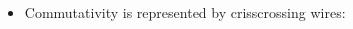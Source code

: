 \documentclass{llncs}
\begin{document}
\begin{itemize}
\item Commutativity is represented by crisscrossing wires:

\begin{multicols}{4}
\begin{center}
\end{center}
\begin{center}
\end{center}

\begin{center}
\end{center}

\begin{center}
\end{center}
\end{multicols}




\end{itemize}
\end{document}
